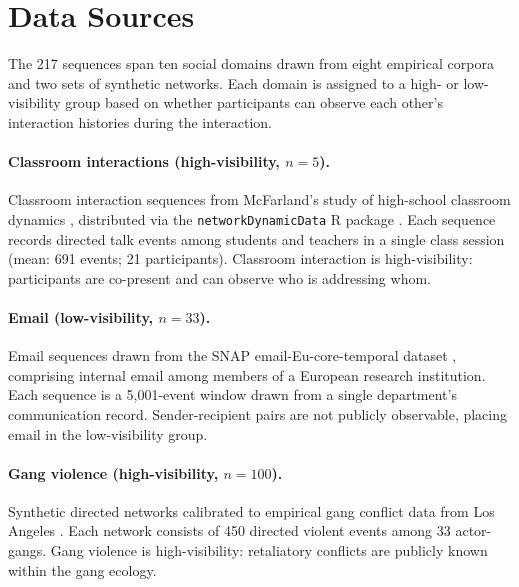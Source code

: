 \documentclass[11pt]{article}
\begin{document}



\appendix

\section{Data Sources}
\label{sec:datasources}

The 217 sequences span ten social domains drawn from eight empirical corpora and two sets of synthetic networks. Each domain is assigned to a high- or low-visibility group based on whether participants can observe each other's interaction histories during the interaction.

\paragraph{Classroom interactions (high-visibility, $n = 5$).}
Classroom interaction sequences from McFarland's study of high-school classroom dynamics \citep{mcfarland_classroom}, distributed via the \texttt{networkDynamicData} R package \citep{bender2016package}. Each sequence records directed talk events among students and teachers in a single class session (mean: 691 events; 21 participants). Classroom interaction is high-visibility: participants are co-present and can observe who is addressing whom.

\paragraph{Email (low-visibility, $n = 33$).}
Email sequences drawn from the SNAP email-Eu-core-temporal dataset \citep{snapnets}, comprising internal email among members of a European research institution. Each sequence is a 5,001-event window drawn from a single department's communication record. Sender-recipient pairs are not publicly observable, placing email in the low-visibility group.

\paragraph{Gang violence (high-visibility, $n = 100$).}
Synthetic directed networks calibrated to empirical gang conflict data from Los Angeles \citep{tita2011spatializing,gravel2023rivalries}. Each network consists of 450 directed violent events among 33 actor-gangs. Gang violence is high-visibility: retaliatory conflicts are publicly known within the gang ecology.
\end{document}
